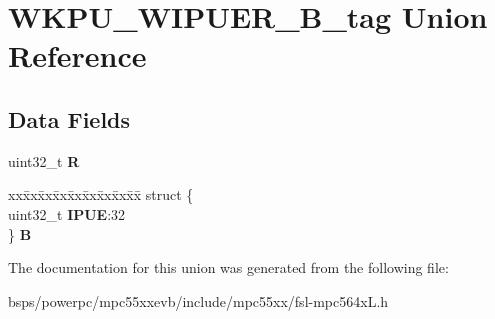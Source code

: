 \hypertarget{unionWKPU__WIPUER__32B__tag}{}\section{W\+K\+P\+U\+\_\+\+W\+I\+P\+U\+E\+R\+\_\+B\+\_\+tag Union Reference}
\label{unionWKPU__WIPUER__32B__tag}
\subsection*{Data Fields}
\begin{DoxyCompactItemize}
\item 
\mbox{\label{unionWKPU__WIPUER__32B__tag_a718d06c64ee3b4016083b3c245bb5c13}} 
uint32\+\_\+t {\bfseries R}
\item 
\mbox{\label{unionWKPU__WIPUER__32B__tag_a460544e522cf7a520b89b6d0f33fcbd0}} 
\begin{tabbing}
xx\=xx\=xx\=xx\=xx\=xx\=xx\=xx\=xx\=\kill
struct \{\\
\>uint32\_t {\bfseries IPUE}:32\\
\} {\bfseries B}\\

\end{tabbing}\end{DoxyCompactItemize}


The documentation for this union was generated from the following file\+:\begin{DoxyCompactItemize}
\item 
bsps/powerpc/mpc55xxevb/include/mpc55xx/fsl-\/mpc564x\+L.\+h\end{DoxyCompactItemize}
